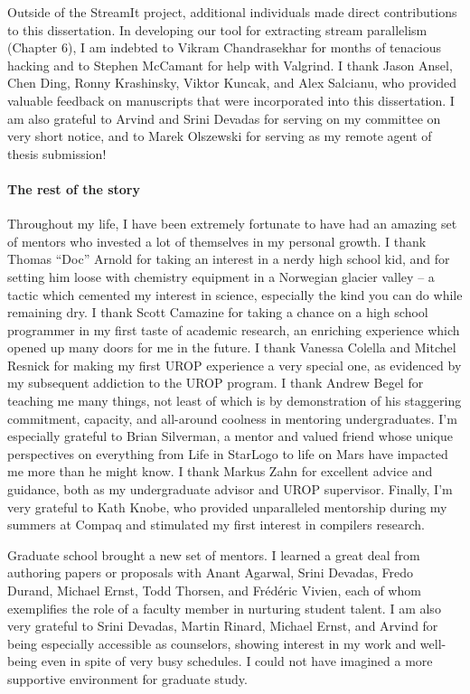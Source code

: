 Outside of the StreamIt project, additional individuals made direct
contributions to this dissertation.  In developing our tool for
extracting stream parallelism (Chapter 6), I am indebted to Vikram
Chandrasekhar for months of tenacious hacking and to Stephen McCamant
for help with Valgrind.  I thank Jason Ansel, Chen Ding, Ronny
Krashinsky, Viktor Kuncak, and Alex Salcianu, who provided valuable
feedback on manuscripts that were incorporated into this dissertation.
I am also grateful to Arvind and Srini Devadas for serving on my
committee on very short notice, and to Marek Olszewski for serving as
my remote agent of thesis submission!

\vspace{-8pt}\paragraph*{The rest of the story} Throughout my life,
I have been extremely fortunate to have had an amazing set of
mentors who invested a lot of themselves in my personal growth.  I
thank Thomas ``Doc'' Arnold for taking an interest in a nerdy high
school kid, and for setting him loose with chemistry equipment in a
Norwegian glacier valley -- a tactic which cemented my interest in
science, especially the kind you can do while remaining dry.
I thank Scott Camazine for taking a chance on a high school programmer
in my first taste of academic research, an enriching experience which
opened up many doors for me in the future.  I thank Vanessa Colella
and Mitchel Resnick for making my first UROP experience a very
special one, as evidenced by my subsequent addiction to the UROP
program.  I thank Andrew Begel for teaching me many things, not
least of which is by demonstration of his staggering commitment,
capacity, and all-around coolness in mentoring undergraduates.  I'm
especially grateful to Brian Silverman, a mentor and valued friend
whose unique perspectives on everything from Life in StarLogo to
life on Mars have impacted me more than he might know.  I thank
Markus Zahn for excellent advice and guidance, both as my
undergraduate advisor and UROP supervisor.  Finally, I'm very
grateful to Kath Knobe, who provided unparalleled mentorship during
my summers at Compaq and stimulated my first interest in compilers
research.

Graduate school brought a new set of mentors.  I learned a great
deal from authoring papers or proposals with Anant Agarwal, Srini
Devadas, Fredo Durand, Michael Ernst, Todd Thorsen, and
Fr\'{e}d\'{e}ric Vivien, each of whom exemplifies the role of a
faculty member in nurturing student talent.  I am also very grateful
to Srini Devadas, Martin Rinard, Michael Ernst, and Arvind for being
especially accessible as counselors, showing interest in my work and
well-being even in spite of very busy schedules.  I could not have
imagined a more supportive environment for graduate study.

